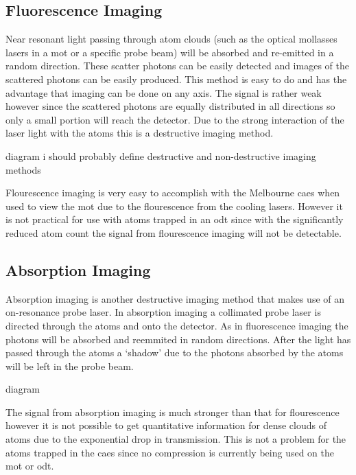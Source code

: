 \subsection{Fluorescence Imaging}

Near resonant light passing through atom clouds (such as the optical mollasses lasers in a \gls{mot} or a specific probe beam) will be absorbed and re-emitted in a random direction. These scatter photons can be easily detected and images of the scattered photons can be easily produced. This method is easy to do and has the advantage that imaging can be done on any axis. The signal is rather weak however since the scattered photons are equally distributed in all directions so only a small portion will reach the detector. Due to the strong interaction of the laser light with the atoms this is a destructive imaging method.

{\color{red} diagram}
{\color{red} i should probably define destructive and non-destructive imaging methods}

Flourescence imaging is very easy to accomplish with the Melbourne \gls{caes} when used to view the \gls{mot} due to the flourescence from the cooling lasers. However it is not practical for use with atoms trapped in an \gls{odt} since with the significantly reduced atom count the signal from flourescence imaging will not be detectable.

\subsection{Absorption Imaging}

Absorption imaging is another destructive imaging method that makes use of an on-resonance probe laser. In absorption imaging a collimated probe laser is directed through the atoms and onto the detector. As in fluorescence imaging the photons will be absorbed and reemmited in random directions. After the light has passed through the atoms a `shadow' due to the photons absorbed by the atoms will be left in the probe beam.

{\color{red} diagram}

The signal from absorption imaging is much stronger than that for flourescence however it is not possible to get quantitative information for dense clouds of atoms due to the exponential drop in transmission\cite{moravchik_imaging_2009}. This is not a problem for the atoms trapped in the \gls{caes} since no compression is currently being used on the \gls{mot} or \gls{odt}.

